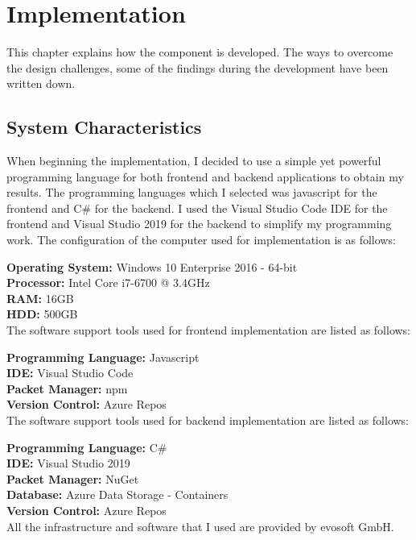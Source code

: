 %
\section{Implementation}\label{sec:implementation}
This chapter explains how the component is developed. The ways to overcome the design challenges, some of the findings during the development have been written down.
%
\subsection{System Characteristics}
When beginning the implementation, I decided to use a simple yet powerful programming language for both frontend and backend applications to obtain my results. The programming languages which I selected was javascript for the frontend and C\# for the backend. I used the Visual Studio Code IDE for the frontend and Visual Studio 2019 for the backend to simplify my programming work. The configuration of the computer used for implementation is as follows:

{\bf Operating System:} Windows 10 Enterprise 2016 - 64-bit\\
{\bf Processor:} Intel Core i7-6700 @ 3.4GHz\\
{\bf RAM:} 16GB\\
{\bf HDD:} 500GB\\


The software support tools used for frontend implementation are listed as follows:

{\bf Programming Language:} Javascript\\
{\bf IDE:} Visual Studio Code\\
{\bf Packet Manager:} npm\\
{\bf Version Control:} Azure Repos\\


The software support tools used for backend implementation are listed as follows:

{\bf Programming Language:} C\#\\
{\bf IDE:} Visual Studio 2019\\
{\bf Packet Manager:} NuGet\\
{\bf Database:} Azure Data Storage - Containers\\
{\bf Version Control:} Azure Repos\\


All the infrastructure and software that I used are provided by evosoft GmbH.
